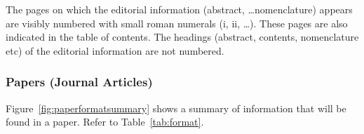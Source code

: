 \documentclass[a5paper, 10pt]{article}
\begin{document}
The pages on which the editorial information (abstract, \dots nomenclature) appears are visibly numbered with small roman numerals (i, ii, \dots).
These pages are also indicated in the table of contents.  The
headings (abstract, contents, nomenclature etc) of the editorial
information are not numbered.

\subsubsection{Papers (Journal Articles)}
Figure~\ref{fig:paperformatsummary} shows a summary of information
that will be found in a paper. Refer to Table~\ref{tab:format}.
\begin{figure}[htbp]
  \centering
  \fbox{
    \begin{demopage}
      \rule{0.9\textwidth}{2pt} \\
      \rule{0.9\textwidth}{2pt} \\
      

\end{demopage}}
\end{figure}
\end{document}
